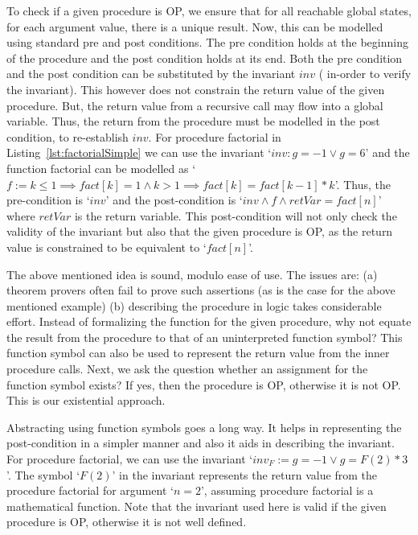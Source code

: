 \documentclass{llncs}
\newcommand{\inv}{\mathit{inv}}
\newcommand{\retVar}{\textit{retVar}}
\newcommand{\F}{\mathit{F}}
\newcommand{\fact}{\mathit{fact}}
\begin{document}
To check if a given procedure is OP, we ensure that for all reachable
global states, for each argument value, there is a unique result. Now,
this can be modelled using standard pre and post conditions. The pre
condition holds at the beginning of the procedure and the post
condition holds at its end. Both the pre condition and the post
condition can be substituted by the invariant $\inv$ ( in-order to
verify the invariant). This however does not constrain the return
value of the given procedure. But, the return value from a recursive
call may flow into a global variable. Thus, the return from the
procedure must be modelled in the post condition, to
re-establish $\inv$.  For procedure factorial in
Listing~\ref{lst:factorialSimple} we can use the invariant `$\inv : g
= -1 \vee g = 6$' and the function factorial can be modelled as `$ f
:= k \leq 1 \implies \fact[k] = 1 \wedge k >1 \implies \fact[k] =
\fact[k-1]*k$'. Thus, the pre-condition is `$\inv$' and the
post-condition is `$\inv \wedge f \wedge \retVar = fact[n]$' where
$\retVar$ is the return variable. This post-condition will not only
check the validity of the invariant but also that the given procedure
is OP, as the return value is constrained to be equivalent to
`$fact[n]$'.

The above mentioned idea is sound, modulo ease of use. The issues are:
(a) theorem provers often fail to prove such assertions (as is the
case for the above mentioned example) (b) describing the procedure in
logic takes considerable effort.  Instead of formalizing the function
for the given procedure, why not equate the result from the procedure
to that of an uninterpreted function symbol? This function symbol can
also be used to represent the return value from the inner procedure
calls. Next, we ask the question whether an assignment for the
function symbol exists? If yes, then the procedure is OP, otherwise it
is not OP.  This is our existential approach.

Abstracting using function symbols goes a long way. It helps in
representing the post-condition in a simpler manner and also it aids
in describing the invariant. For procedure factorial, we can use
the invariant `$\inv_{\F}:=g = -1 \vee g = \F(2) * 3$'. The symbol
`$\F(2)$' in the invariant represents the return value from the
procedure factorial for argument `$n = 2$', assuming procedure
factorial is a mathematical function. Note that the invariant used
here is valid if the given procedure is OP, otherwise it is not well
defined.

\end{document}
